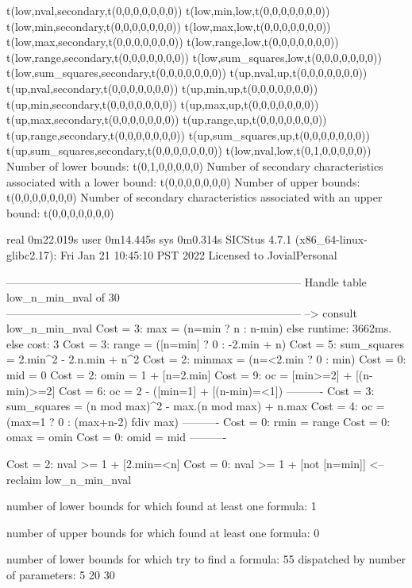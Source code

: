 t(low,nval,secondary,t(0,0,0,0,0,0,0))
t(low,min,low,t(0,0,0,0,0,0,0))
t(low,min,secondary,t(0,0,0,0,0,0,0))
t(low,max,low,t(0,0,0,0,0,0,0))
t(low,max,secondary,t(0,0,0,0,0,0,0))
t(low,range,low,t(0,0,0,0,0,0,0))
t(low,range,secondary,t(0,0,0,0,0,0,0))
t(low,sum_squares,low,t(0,0,0,0,0,0,0))
t(low,sum_squares,secondary,t(0,0,0,0,0,0,0))
t(up,nval,up,t(0,0,0,0,0,0,0))
t(up,nval,secondary,t(0,0,0,0,0,0,0))
t(up,min,up,t(0,0,0,0,0,0,0))
t(up,min,secondary,t(0,0,0,0,0,0,0))
t(up,max,up,t(0,0,0,0,0,0,0))
t(up,max,secondary,t(0,0,0,0,0,0,0))
t(up,range,up,t(0,0,0,0,0,0,0))
t(up,range,secondary,t(0,0,0,0,0,0,0))
t(up,sum_squares,up,t(0,0,0,0,0,0,0))
t(up,sum_squares,secondary,t(0,0,0,0,0,0,0))
t(low,nval,low,t(0,1,0,0,0,0,0))
Number of lower bounds:                                             t(0,1,0,0,0,0,0)
Number of secondary characteristics associated with a lower bound:  t(0,0,0,0,0,0,0)
Number of upper bounds:                                             t(0,0,0,0,0,0,0)
Number of secondary characteristics associated with an upper bound: t(0,0,0,0,0,0,0)

real	0m22.019s
user	0m14.445s
sys	0m0.314s
SICStus 4.7.1 (x86_64-linux-glibc2.17): Fri Jan 21 10:45:10 PST 2022
Licensed to JovialPersonal


--------------------------------------------------------------------------------
Handle table low_n_min_nval of 30
--------------------------------------------------------------------------------
--> consult low_n_min_nval
Cost =  3:  max         = (n=min ? n : n-min)
else runtime: 3662ms. else cost: 3
Cost =  3:  range       = ([n=min] ? 0 : -2.min + n) %
Cost =  5:  sum_squares = 2.min^2 - 2.n.min + n^2
Cost =  2:  minmax      = (n=<2.min ? 0 : min)
Cost =  0:  mid         = 0
Cost =  2:  omin        = 1 + [n=2.min]
Cost =  9:  oc          = [min>=2] + [(n-min)>=2]
Cost =  6:  oc          = 2 - ([min=1] + [(n-min)=<1])
----------
Cost =  3:  sum_squares = (n mod max)^2 - max.(n mod max) + n.max
Cost =  4:  oc          = (max=1 ? 0 : (max+n-2) fdiv max)
----------
Cost =  0:  rmin        = range
Cost =  0:  omax        = omin
Cost =  0:  omid        = mid
----------

Cost =  2:  nval >= 1 + [2.min=<n]
Cost =  0:  nval >= 1 + [not [n=min]]
<-- reclaim low_n_min_nval

number of lower bounds for which found at least one formula: 1

number of upper bounds for which found at least one formula: 0

number of lower bounds for which try to find a formula: 55
dispatched by number of parameters: 5  20  30

